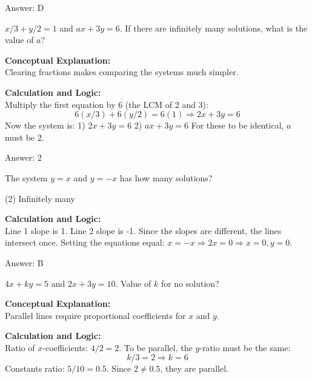 \documentclass[11pt,paper=a4,answers]{exam}
\begin{document}
\begin{questions}
\begin{solution}
\vspace{15pt}
Answer: \colorbox{yellow!100}{D}
\end{solution}

\question
$x/3 + y/2 = 1$ and $ax + 3y = 6$. If there are infinitely many solutions, what is the value of $a$?

\begin{solution}
\textbf{Conceptual Explanation:} \\
Clearing fractions makes comparing the systems much simpler.

\vspace{10pt}
\textbf{Calculation and Logic:} \\
Multiply the first equation by 6 (the LCM of 2 and 3):
\[ 6(x/3) + 6(y/2) = 6(1) \Rightarrow 2x + 3y = 6 \]
Now the system is:
1) $2x + 3y = 6$
2) $ax + 3y = 6$
For these to be identical, $a$ must be 2.

\vspace{15pt}
Answer: \colorbox{yellow!100}{2}
\end{solution}

\question
The system $y = x$ and $y = -x$ has how many solutions?
\begin{tasks}(2)
    \task Infinitely many
\end{tasks}

\begin{solution}
\textbf{Calculation and Logic:} \\
Line 1 slope is 1. Line 2 slope is -1.
Since the slopes are different, the lines intersect once.
Setting the equations equal: $x = -x \Rightarrow 2x = 0 \Rightarrow x = 0, y = 0$.

\vspace{15pt}
Answer: \colorbox{yellow!100}{B}
\end{solution}

\question
$4x + ky = 5$ and $2x + 3y = 10$. Value of $k$ for no solution?

\begin{solution}
\textbf{Conceptual Explanation:} \\
Parallel lines require proportional coefficients for $x$ and $y$.

\vspace{10pt}
\textbf{Calculation and Logic:} \\
Ratio of $x$-coefficients: $4/2 = 2$.
To be parallel, the $y$-ratio must be the same:
\[ k/3 = 2 \Rightarrow k = 6 \]
Constants ratio: $5/10 = 0.5$. Since $2 \neq 0.5$, they are parallel.


\end{solution}
\end{questions}
\end{document}
